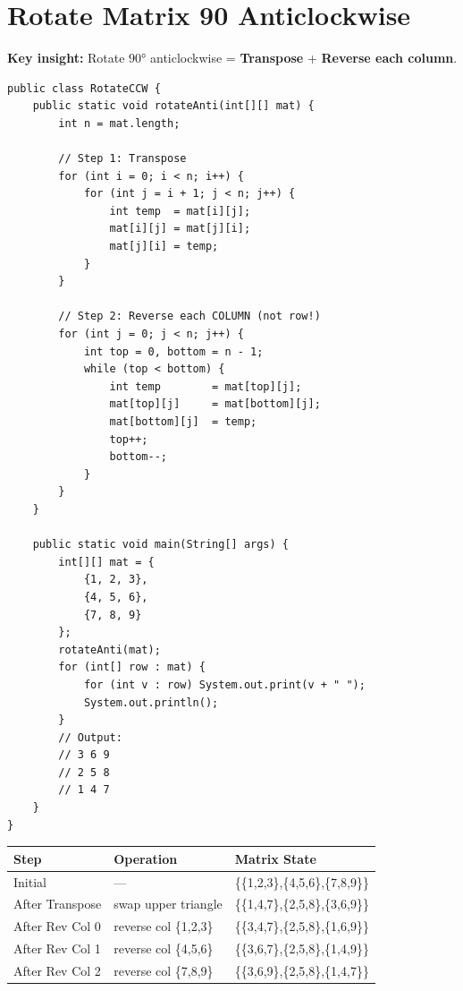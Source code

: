 \documentclass[12pt,a4paper,oneside]{book}
\begin{document}
\section{Rotate Matrix 90\textdegree{} Anticlockwise}

\textbf{Key insight:} Rotate $90°$ anticlockwise = \textbf{Transpose} + \textbf{Reverse each column}.

\begin{lstlisting}[caption={Rotate Matrix 90° Anticlockwise --- Transpose + Reverse Columns}]
public class RotateCCW {
    public static void rotateAnti(int[][] mat) {
        int n = mat.length;

        // Step 1: Transpose
        for (int i = 0; i < n; i++) {
            for (int j = i + 1; j < n; j++) {
                int temp  = mat[i][j];
                mat[i][j] = mat[j][i];
                mat[j][i] = temp;
            }
        }

        // Step 2: Reverse each COLUMN (not row!)
        for (int j = 0; j < n; j++) {
            int top = 0, bottom = n - 1;
            while (top < bottom) {
                int temp        = mat[top][j];
                mat[top][j]     = mat[bottom][j];
                mat[bottom][j]  = temp;
                top++;
                bottom--;
            }
        }
    }

    public static void main(String[] args) {
        int[][] mat = {
            {1, 2, 3},
            {4, 5, 6},
            {7, 8, 9}
        };
        rotateAnti(mat);
        for (int[] row : mat) {
            for (int v : row) System.out.print(v + " ");
            System.out.println();
        }
        // Output:
        // 3 6 9
        // 2 5 8
        // 1 4 7
    }
}
\end{lstlisting}

\begin{dryrun}
\begin{center}
\begin{tabular}{lll}
\toprule
\textbf{Step} & \textbf{Operation} & \textbf{Matrix State}\\
\midrule
Initial           & ---                    & \{\{1,2,3\},\{4,5,6\},\{7,8,9\}\}\\
After Transpose   & swap upper triangle    & \{\{1,4,7\},\{2,5,8\},\{3,6,9\}\}\\
After Rev Col 0   & reverse col \{1,2,3\}  & \{\{3,4,7\},\{2,5,8\},\{1,6,9\}\}\\
After Rev Col 1   & reverse col \{4,5,6\}  & \{\{3,6,7\},\{2,5,8\},\{1,4,9\}\}\\
After Rev Col 2   & reverse col \{7,8,9\}  & \{\{3,6,9\},\{2,5,8\},\{1,4,7\}\}\\
\bottomrule
\end{tabular}
\end{center}
\end{dryrun}
\end{document}

